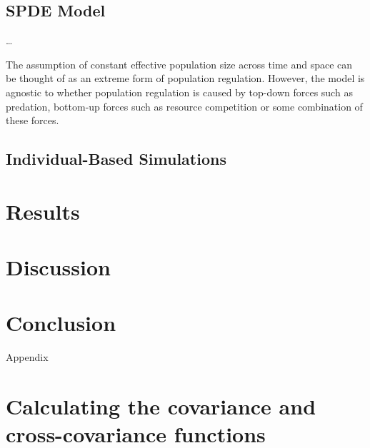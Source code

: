 \documentclass{article}
\begin{document}
\hypertarget{spde-model}{%
\subsection{SPDE Model}\label{spde-model}}

\ldots{}

The assumption of constant effective population size across time and
space can be thought of as an extreme form of population regulation.
However, the model is agnostic to whether population regulation is
caused by top-down forces such as predation, bottom-up forces such as
resource competition or some combination of these forces.

\hypertarget{individual-based-simulations}{%
\subsection{Individual-Based
Simulations}\label{individual-based-simulations}}

\hypertarget{results}{%
\section{Results}\label{results}}

\hypertarget{discussion}{%
\section{Discussion}\label{discussion}}

\hypertarget{conclusion}{%
\section{Conclusion}\label{conclusion}}

\newpage

\appendix

\begin{center}
\Large{Appendix}
\end{center}

\hypertarget{calculating-the-covariance-and-cross-covariance-functions}{%
\section{Calculating the covariance and cross-covariance
functions}\label{calculating-the-covariance-and-cross-covariance-functions}}
\end{document}
